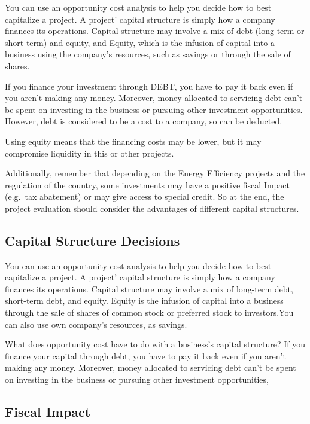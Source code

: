 \documentclass[]{book}
\theoremstyle{definition}
\theoremstyle{definition}
\theoremstyle{definition}
\theoremstyle{remark}
\begin{document}
You can use an opportunity cost analysis to help you decide how to best
capitalize a project. A project' capital structure is simply how a
company finances its operations. Capital structure may involve a mix of
debt (long-term or short-term) and equity, and Equity, which is the
infusion of capital into a business using the company's resources, such
as savings or through the sale of shares.

If you finance your investment through DEBT, you have to pay it back
even if you aren't making any money. Moreover, money allocated to
servicing debt can't be spent on investing in the business or pursuing
other investment opportunities. However, debt is considered to be a cost
to a company, so can be deducted.

Using equity means that the financing costs may be lower, but it may
compromise liquidity in this or other projects.

Additionally, remember that depending on the Energy Efficiency projects
and the regulation of the country, some investments may have a positive
fiscal Impact (e.g.~tax abatement) or may give access to special credit.
So at the end, the project evaluation should consider the advantages of
different capital structures.

\subsection{Capital Structure
Decisions}\label{capital-structure-decisions}

You can use an opportunity cost analysis to help you decide how to best
capitalize a project. A project' capital structure is simply how a
company finances its operations. Capital structure may involve a mix of
long-term debt, short-term debt, and equity. Equity is the infusion of
capital into a business through the sale of shares of common stock or
preferred stock to investors.You can also use own company's resources,
as savings.

What does opportunity cost have to do with a business's capital
structure? If you finance your capital through debt, you have to pay it
back even if you aren't making any money. Moreover, money allocated to
servicing debt can't be spent on investing in the business or pursuing
other investment opportunities,

\subsection{Fiscal Impact}\label{fiscal-impact}
\end{document}
